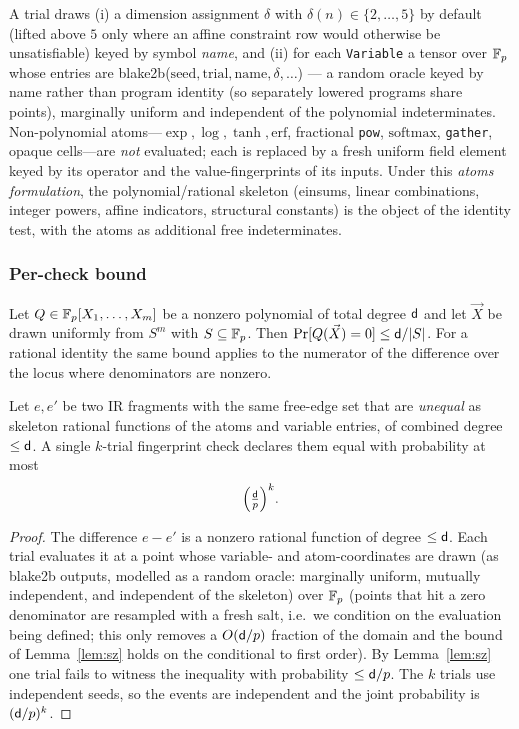 \documentclass[sigplan,10pt,review]{acmart}
\begin{document}
A trial draws (i) a dimension assignment $\delta$ with
$\delta(n)\in\{2,\dots,5\}$ by default (lifted above $5$ only where an
affine constraint row would otherwise be unsatisfiable) keyed by symbol
\emph{name}, and (ii) for each
\texttt{Variable} a tensor over $\mathbb{F}_{p}$ whose entries are
blake2b($\text{seed},\text{trial},\text{name},\delta,\dots$) --- a
random oracle keyed by name rather than program identity (so separately
lowered programs share points), marginally uniform and independent of
the polynomial indeterminates. Non-polynomial
atoms---$\exp,\log,\tanh,\mathrm{erf}$, fractional \texttt{pow},
$\mathrm{softmax}$, \texttt{gather}, opaque cells---are \emph{not}
evaluated; each is replaced by a fresh uniform field element keyed by its
operator and the value-fingerprints of its inputs. Under this
\emph{atoms formulation}, the polynomial/rational skeleton (einsums,
linear combinations, integer powers, affine indicators, structural
constants) is the object of the identity test, with the atoms as
additional free indeterminates.

\subsubsection*{Per-check bound}

\begin{lemma}
\label{lem:sz}
Let $Q\in\mathbb{F}_{p}[X_1,\dots,X_m]$ be a nonzero polynomial of total degree
$\mathsf{d}$ and let $\vec X$ be drawn uniformly from $S^m$ with $S\subseteq\mathbb{F}_{p}$.
Then $\Pr[Q(\vec X)=0]\le \mathsf{d}/|S|$. For a rational identity the same
bound applies to the numerator of the difference over the locus where
denominators are nonzero.
\end{lemma}

\begin{theorem}\label{thm:percheck}
Let $e,e'$ be two IR fragments with the same free-edge set that are
\emph{unequal} as skeleton rational functions of the atoms and variable
entries, of combined degree $\le\mathsf{d}$. A single $k$-trial fingerprint
check declares them equal with probability at most
\[
   \Big(\tfrac{\mathsf{d}}{p}\Big)^{k}.
\]
\end{theorem}

\begin{proof}
The difference $e-e'$ is a nonzero rational function of degree $\le\mathsf{d}$.
Each trial evaluates it at a point whose variable- and atom-coordinates
are drawn (as blake2b outputs, modelled as a random oracle: marginally
uniform, mutually independent, and independent of the skeleton) over
$\mathbb{F}_{p}$ (points that hit a zero
denominator are resampled with a fresh salt, i.e.\ we condition on the
evaluation being defined; this only removes a $O(\mathsf{d}/p)$ fraction of the
domain and the bound of Lemma~\ref{lem:sz} holds on the conditional to
first order). By Lemma~\ref{lem:sz} one trial fails to witness the
inequality with probability $\le\mathsf{d}/p$. The $k$ trials use independent
seeds, so the events are independent and the joint probability is
$(\mathsf{d}/p)^{k}$.
\end{proof}
\end{document}
